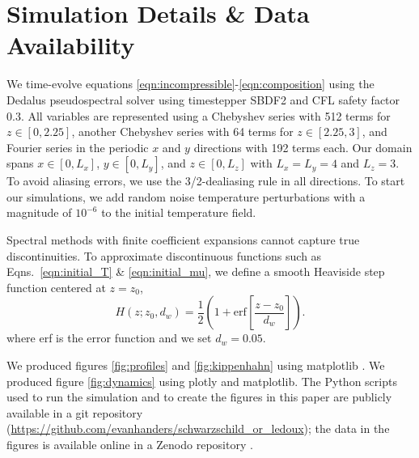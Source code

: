 \section{Simulation Details \& Data Availability}
\label{app:simulation_details}
We time-evolve equations \ref{eqn:incompressible}-\ref{eqn:composition} using the Dedalus pseudospectral solver \citep[git commit 1339061]{burns_etal_2020} using timestepper SBDF2 \citep{wang_ruuth_2008} and CFL safety factor 0.3.
All variables are represented using a Chebyshev series with 512 terms for $z \in [0, 2.25]$, another Chebyshev series with 64 terms for $z \in [2.25, 3]$, and Fourier series in the periodic $x$ and $y$ directions with 192 terms each.
Our domain spans $x \in [0, L_x]$, $y \in [0, L_y]$, and $z \in [0, L_z]$ with $L_x = L_y = 4$ and $L_z = 3$.
To avoid aliasing errors, we use the 3/2-dealiasing rule in all directions.
To start our simulations, we add random noise temperature perturbations with a magnitude of $10^{-6}$ to the initial temperature field.

Spectral methods with finite coefficient expansions cannot capture true discontinuities.
To approximate discontinuous functions such as Eqns.~\ref{eqn:initial_T} \& \ref{eqn:initial_mu}, we define a smooth Heaviside step function centered at $z = z_0$,
\begin{equation}
H(z; z_0, d_w) = \frac{1}{2}\left(1 + \mathrm{erf}\left[\frac{z - z_0}{d_w}\right]\right).
\label{eqn:heaviside}
\end{equation}
where erf is the error function and we set $d_w = 0.05$.

We produced figures \ref{fig:profiles} and \ref{fig:kippenhahn} using matplotlib \citep{hunter2007, mpl3.3.4}.
We produced figure \ref{fig:dynamics} using plotly \citep{plotly} and matplotlib.
The Python scripts used to run the simulation and to create the figures in this paper are publicly available in a git repository (\url{https://github.com/evanhanders/schwarzschild_or_ledoux}); the data in the figures is available online in a Zenodo repository \citep{supp}.
